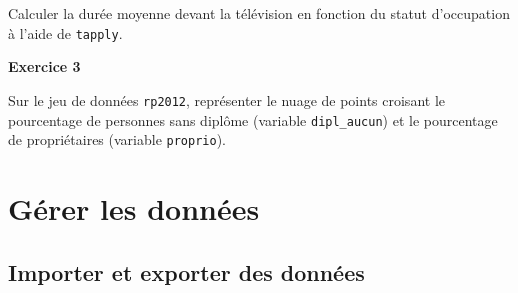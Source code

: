 \documentclass[12pt,]{book}
\newenvironment{Shaded}{\begin{snugshade}}{\end{snugshade}}
\newcommand{\CommentTok}[1]{\textcolor[rgb]{0.37,0.37,0.37}{\textit{#1}}}
\newcommand{\DataTypeTok}[1]{\textcolor[rgb]{0.27,0.27,0.27}{#1}}
\newcommand{\KeywordTok}[1]{\textcolor[rgb]{0.27,0.27,0.27}{\textbf{#1}}}
\newcommand{\NormalTok}[1]{#1}
\newcommand{\OperatorTok}[1]{\textcolor[rgb]{0.43,0.43,0.43}{\textbf{#1}}}
\newcommand{\OtherTok}[1]{\textcolor[rgb]{0.37,0.37,0.37}{#1}}
\newcommand{\StringTok}[1]{\textcolor[rgb]{0.5,0.5,0.5}{#1}}
\begin{document}
\begin{Shaded}
\end{Shaded}

\fi

Calculer la durée moyenne devant la télévision en fonction du statut d'occupation à l'aide de \texttt{tapply}.

\textbf{Exercice 3}

Sur le jeu de données \texttt{rp2012}, représenter le nuage de points croisant le pourcentage de personnes sans diplôme (variable \texttt{dipl\_aucun}) et le pourcentage de propriétaires (variable \texttt{proprio}).

\hypertarget{guxe9rer-les-donnuxe9es}{%
\section{Gérer les données}\label{guxe9rer-les-donnuxe9es}}

\hypertarget{importer-et-exporter-des-donnuxe9es}{%
\subsection{Importer et exporter des données}\label{importer-et-exporter-des-donnuxe9es}}
\end{document}
